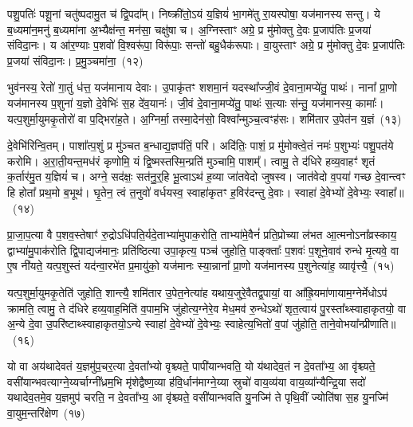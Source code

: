 पशु॒पतिः॑ पशू॒नां चतु॑ष्पदामु॒त च॑ द्वि॒पदा᳚म्। निष्क्री॑तो॒\-ऽयं य॒ज्ञियं॑ भा॒गमे॑तु रा॒यस्पोषा॒ यज॑मानस्य सन्तु। ये ब॒ध्यमा॑न॒मनु॑ ब॒ध्यमा॑ना अ॒भ्यैक्ष॑न्त॒ मन॑सा॒ चक्षु॑षा च। अ॒ग्निस्ताꣳ अग्रे॒ प्र मु॑मोक्तु दे॒वः प्र॒जा\-प॑तिः प्र॒जया॑ संविदा॒नः। य आ॑र॒ण्याः प॒शवो॑ वि॒श्वरू॑पा॒ विरू॑पाः॒ सन्तो॑ बहु॒धैक॑रूपाः। वा॒युस्ताꣳ अग्रे॒ प्र मु॑मोक्तु दे॒वः प्र॒जा\-प॑तिः प्र॒जया॑ संविदा॒नः। प्र॒मु॒ञ्चमा॑ना॒~(१२)

भुव॑नस्य॒ रेतो॑ गा॒तुं ध॑त्त॒ यज॑मानाय देवाः। उ॒पाकृ॑तꣳ शशमा॒नं यदस्था᳚ज्जी॒वं दे॒वाना॒मप्ये॑तु॒ पाथः॑। नाना᳚ प्रा॒णो यज॑मानस्य प॒शुना॑ य॒ज्ञो दे॒वेभिः॑ स॒ह दे॑व॒यानः॑। जी॒वं दे॒वाना॒मप्ये॑तु॒ पाथः॑ स॒त्याः स॑न्तु॒ यज॑मानस्य॒ कामाः᳚। यत्प॒शुर्मा॒युमकृ॒तोरो॑ वा प॒द्भिरा॑ह॒ते। अ॒ग्निर्मा॒ तस्मा॒देन॑सो॒ विश्वा᳚न्मुञ्च॒त्वꣳह॑सः। शमि॑तार उ॒पेत॑न य॒ज्ञं~(१३)

दे॒वेभि॑रिन्वि॒तम्। पाशा᳚त्प॒शुं प्र मु॑ञ्चत ब॒न्धाद्य॒ज्ञप॑तिं॒ परि॑। अदि॑तिः॒ पाशं॒ प्र मु॑मोक्त्वे॒तं नमः॑ प॒शुभ्यः॑ पशु॒पत॑ये करोमि। अ॒रा॒ती॒यन्त॒मध॑रं कृणोमि॒ यं द्वि॒ष्मस्तस्मि॒न्प्रति॑ मुञ्चामि॒ पाशम्᳚। त्वामु॒ ते द॑धिरे हव्य॒वाहꣳ॑ शृतं क॒र्तार॑मु॒त य॒ज्ञियं॑ च। अग्ने॒ सद॑क्षः॒ सत॑नु॒र्॒\mbox{}हि भू॒त्वा\-ऽथ॑ ह॒व्या जा॑तवेदो जुषस्व। जात॑वेदो व॒पया॑ गच्छ दे॒वान्त्वꣳ हि होता᳚ प्रथ॒मो ब॒भूथ॑। घृ॒तेन॒ त्वं त॒नुवो॑ वर्धयस्व॒ स्वाहा॑कृतꣳ ह॒विर॑दन्तु दे॒वाः। स्वाहा॑ दे॒वेभ्यो॑ दे॒वेभ्यः॒ स्वाहा᳚॥~(१४)

{\anuvakamend[{ईशे᳚ प्रमु॒ञ्चमा॑ना य॒ज्ञन्त्वꣳ षोड॑श च}]}%

प्रा॒जा॒प॒त्या वै प॒शव॒स्तेषाꣳ॑ रु॒द्रो\-ऽधि॑पति॒र्यदे॒ताभ्या॑मुपाक॒रोति॒ ताभ्या॑मे॒वैनं॑ प्रति॒प्रोच्या ल॑भत आ॒त्मनो\-ऽना᳚व्रस्काय॒ द्वाभ्या॑मु॒पा\-क॑रोति द्वि॒पाद्यज॑मानः॒ प्रति॑ष्ठित्या उपा॒कृत्य॒ पञ्च॑ जुहोति॒ पाङ्क्ताः᳚ प॒शवः॑ प॒शूने॒वाव॑ रुन्धे मृ॒त्यवे॒ वा ए॒ष नी॑यते॒ यत्प॒शुस्तं यद॑न्वा॒रभे॑त प्र॒मायु॑को॒ यज॑मानः स्या॒न्नाना᳚ प्रा॒णो यज॑मानस्य प॒शुनेत्या॑ह॒ व्यावृ॑त्त्यै॒~(१५)

यत्प॒शुर्मा॒युमकृ॒तेति॑ जुहोति॒ शान्त्यै॒ शमि॑तार उ॒पेत॒नेत्या॑ह यथाय॒जुरे॒वैतद्व॒पायां॒ वा आ᳚ह्रि॒यमा॑णायाम॒ग्नेर्मेधो\-ऽप॑ क्रामति॒ त्वामु॒ ते द॑धिरे हव्य॒वाह॒मिति॑ व॒पाम॒भि जु॑होत्य॒ग्नेरे॒व मेध॒मव॑ रु॒न्धे\-ऽथो॑ शृत॒त्वाय॑ पु॒रस्ता᳚थ्\-स्वाहाकृतयो॒ वा अ॒न्ये दे॒वा उ॒परि॑ष्टाथ्\-स्वाहाकृतयो॒\-ऽन्ये स्वाहा॑ दे॒वेभ्यो॑ दे॒वेभ्यः॒ स्वाहेत्य॒भितो॑ व॒पां जु॑होति॒ ताने॒वोभया᳚न्प्रीणाति॥~(१६)

{\anuvakamend[{व्यावृ॑त्त्या अ॒भितो॑ व॒पां पञ्च॑ च}]}%

यो वा अय॑थादेवतं य॒ज्ञमु॑प॒चर॒त्या दे॒वता᳚भ्यो वृश्च्यते॒ पापी॑यान्भवति॒ यो य॑थादेव॒तं न दे॒वता᳚भ्य॒ आ वृ॑श्च्यते॒ वसी॑यान्भवत्याग्ने॒य्यर्चाग्नी᳚ध्रम॒भि मृ॑शेद्वैष्ण॒व्या ह॑वि॒र्धान॑माग्ने॒य्या स्रुचो॑ वाय॒व्य॑या वाय॒व्या᳚न्यैन्द्रि॒या सदो॑ यथादेव॒तमे॒व य॒ज्ञमुप॑ चरति॒ न दे॒वता᳚भ्य॒ आ वृ॑श्च्यते॒ वसी॑यान्भवति यु॒नज्मि॑ ते पृथि॒वीं ज्योति॑षा स॒ह यु॒नज्मि॑ वा॒युम॒न्तरि॑क्षेण~(१७)

